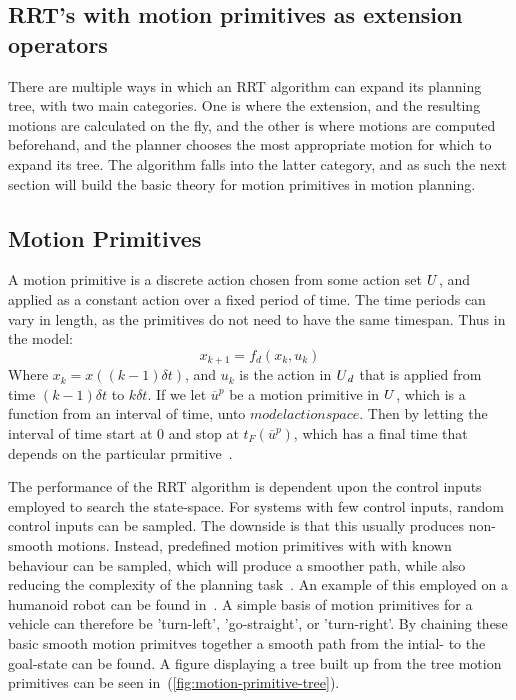 \subsection{RRT's with motion primitives as extension operators}

There are multiple ways in which an \ac{RRT} algorithm can expand its planning
tree, with two main categories. One is where the extension, and the resulting
motions are calculated on the fly, and the other is where motions are computed
beforehand, and the planner chooses the most appropriate motion for which to
expand its tree. The \rrtfunnel{} algorithm falls into the latter category, and
as such the next section will build the basic theory for motion primitives in
motion planning.

\subsection{Motion Primitives}

A motion primitive is a discrete action chosen from some action set
\(U{}\), and applied as a constant action over a fixed period of
time. The time periods can vary in length, as the primitives do not need to have
the same timespan. Thus in the model:
\[
  x_{k+1} = f_d(x_k,u_k)
\]
Where \(x_k = x((k-1)\delta{}t)\), and \(u_k\) is the action in
\(U{}_d\) that is applied from time \((k-1)\delta{}t\) to
\(k\delta{}t\). If we let \(\overline{u}^p\) be a motion primitive in
\(U{}\), which is a function from an interval of time, unto
\(modelactionspace{}\). Then by letting the interval of time start at 0 and stop
at \(t_F(\overline{u}^p)\), which has a final time that depends on the
particular prmitive~\cite{Lav06}.

The performance of the \ac{RRT} algorithm is dependent upon the control inputs
employed to search the state-space. For systems with few control inputs, random
control inputs can be sampled. The downside is that this usually produces
non-smooth motions. Instead, predefined motion primitives with with known
behaviour can be sampled, which will produce a smoother path, while also
reducing the complexity of the planning
task~\cite{vonasekGlobalMotionPlanning2013}. An example of this employed on a
humanoid robot can be found in~\cite{hauserUsingMotionPrimitives2008}. A simple
basis of motion primitives for a vehicle can therefore be 'turn-left',
'go-straight', or 'turn-right'. By chaining these basic smooth motion primitves
together a smooth path from the intial- to the goal-state can be found. A figure
displaying a tree built up from the tree motion primitives can be seen
in~(\ref{fig:motion-primitive-tree}).

